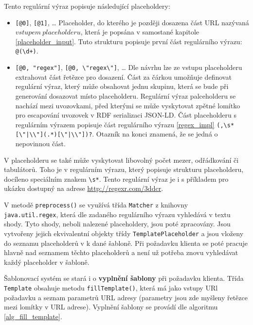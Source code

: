 \documentclass[thesis=B,czech]{FITthesis}[2012/06/26]
\begin{document}
 Tento regulární výraz popisuje následující placeholdery:
 \begin{itemize}
  \item \texttt{[@0]}, \texttt{[@1]}, \ldots
    \subitem Placeholder, do kterého je později dosazena část URL nazývaná $vstupem\ placeholderu$, která je popsána v samostané kapitole \ref{placeholder_input}.
	   Tuto strukturu popisuje první část regulárního výrazu: \texttt{@(\textbackslash d+)}.
  \item \texttt{[@0, "regex"]},  \texttt{[@0, \textbackslash "regex\textbackslash "]}, \ldots
    \subitem Dle návrhu lze ze vstupu placeholderu extrahovat část řetězce pro dosazení. Část za čárkou umožňuje definovat regulární výraz, který může obsahovat
    jednu skupinu, která se bude při generování dosazovat místo placeholderu. Regulární výraz palceholderu se nachází mezi uvozovkami, před kterými se může vyskytovat
    zpětné lomítko pro escapování uvozovek v RDF serializaci JSON-LD.
    \subitem Část placeholderu s regulárním výrazem popisuje část regulárního výrazu \ref{regex_impl}
    \texttt{(,\textbackslash s*[\textbackslash"|\textbackslash \textbackslash"](.*)[\textbackslash"|\textbackslash \textbackslash"])?}. Otazník na konci znamená,
    že se jedná o nepovinnou část.
    
 \end{itemize}
 
 V placeholderu se také může vyskytovat libovolný počet mezer, odřádkování či tabulátorů. Toho je v regulárním výrazu, který popisuje strukturu placeholderu, 
 docíleno speciálním znakem \texttt{\textbackslash s*}. Tento regulární výraz je i s příkladem pro ukázku dostupný na adrese \url{http://regexr.com/3ddcr}.
 
 V metodě \texttt{preprocess()} se využívá třída \texttt{Matcher} z knihovny\\ \texttt{java.util.regex}, která dle zadaného regulárního výrazu vyhledává
 v textu shody. Tyto shody, neboli nalezené placeholdery, jsou poté zpracovány. Jsou vytvořeny jejich ekvivalentní objekty třídy \texttt{TemplatePlaceholder}
 a jsou vloženy do seznamu placeholderů v k dané šabloně. Při požadavku klienta se poté pracuje hlavně nad seznamem těchto placeholderů a není už potřeba znovu vyhledávat
 každý placeholder v šabloně.
 
 Šablonovací systém se stará i o \textbf{vyplnění šablony} při požadavku klienta. Třída \texttt{Template} obsahuje metodu \texttt{fillTemplate()}, která má jako
 vstupy URl požadavku a seznam parametrů URL adresy (parametry jsou zde myšleny řetězce mezi lomítky v URL adrese).
 Vyplnění šablony se provádí dle algoritmu \ref{alg_fill_template}.
 
\end{document}
